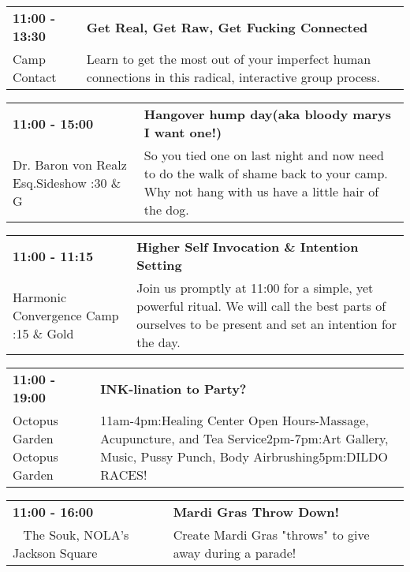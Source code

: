 \begin{tabular}{ p{1in} p{2.2in} }
    \textbf{11:00 - 13:30} & \textbf{Get Real, Get Raw, Get Fucking Connected} \\
    Camp Contact \newline  & Learn to get the most out of your imperfect human connections in this radical, interactive group process. \\
    \hline 
\end{tabular}
    
\begin{tabular}{ p{1in} p{2.2in} }
    \textbf{11:00 - 15:00} & \textbf{Hangover hump day(aka bloody marys I want one!)} \\
    Dr. Baron von Realz Esq.Sideshow \newline 4:30 \& G & So you tied one on last night and now need to do the walk of shame back to your camp. Why not hang with us have a little hair of the dog. \\
    \hline 
\end{tabular}
    
\begin{tabular}{ p{1in} p{2.2in} }
    \textbf{11:00 - 11:15} & \textbf{Higher Self Invocation \& Intention Setting} \\
    Harmonic Convergence Camp \newline 4:15 \& Gold & Join us promptly at 11:00 for a simple, yet powerful ritual.  We will call the best parts of ourselves to be present and set an intention for the day. \\
    \hline 
\end{tabular}
    
\begin{tabular}{ p{1in} p{2.2in} }
    \textbf{11:00 - 19:00} & \textbf{INK-lination to Party?} \\
    Octopus Garden \newline Octopus Garden & 11am-4pm:Healing Center Open Hours-Massage, Acupuncture, and Tea Service2pm-7pm:Art Gallery, Music, Pussy Punch, Body Airbrushing5pm:DILDO RACES! \\
    \hline 
\end{tabular}
    
\begin{tabular}{ p{1in} p{2.2in} }
    \textbf{11:00 - 16:00} & \textbf{Mardi Gras Throw Down!} \\
    ~ \newline The Souk, NOLA's Jackson Square  & Create Mardi Gras "throws" to give away during a parade! \\
    \hline 
\end{tabular}
    
